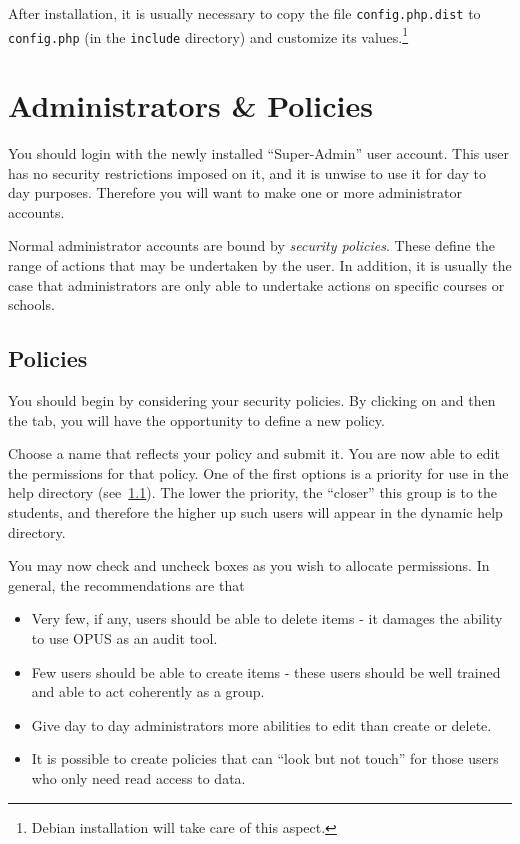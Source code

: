 \documentclass[12 pt]{book}
\begin{document}
After installation, it is usually necessary to copy the file \lstinline!config.php.dist! to
\lstinline!config.php! (in the \lstinline!include! directory) and customize its values.\footnote{Debian installation will take care of this aspect.}

\chapter{Administrators \& Policies}

You should login with the newly installed ``Super-Admin'' user account. This
user has no security restrictions imposed on it, and it is unwise to use it
for day to day purposes. Therefore you will want to make one or more administrator
accounts.


Normal administrator accounts are bound by \emph{security policies}. These define
the range of actions that may be undertaken by the user. In addition, it is usually
the case that administrators are only able to undertake actions on specific courses
or schools.

\section{Policies}

You should begin by considering your security policies. By clicking on
 and then the  tab,
you will have the opportunity to define a new policy.

Choose a name that reflects your policy and submit it. You are now able to
edit the permissions for that policy. One of the first options is a priority
for use in the help directory (see~\ref{}). The lower the priority, the 
``closer'' this group is to the students, and therefore the
higher up such users will appear in the dynamic help directory.

You may now check and uncheck boxes as you wish to allocate permissions. 
In general, the recommendations are that
\begin{itemize}
  \item Very few, if any, users should be able to delete items - it damages
    the ability to use OPUS as an audit tool.
  \item Few users should be able to create items - these users should be well
    trained and able to act coherently as a group.
  \item Give day to day administrators more abilities to edit than create or delete.
  \item It is possible to create policies that can ``look but not touch'' for those
    users who only need read access to data.
\end{itemize}
\end{document}
